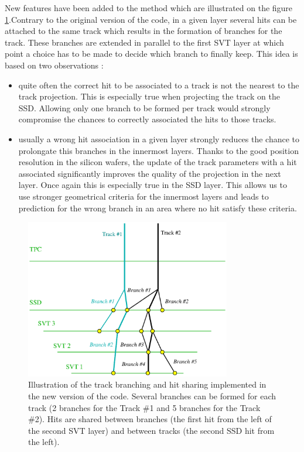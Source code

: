 \documentclass[twoside]{article}
\begin{document}
New features have been added to the method which are illustrated on
the figure \ref{fig:idea}.Contrary to the original version of the
code, in a given layer several hits can be attached to the same track
which results in the formation of branches for the track. These
branches are extended in parallel to the first SVT layer at which
point a choice has to be made to decide which branch to finally
keep. This idea is based on two observations :
\begin{itemize}
\item quite often the correct hit to be associated to a track is not
the nearest to the track projection. This is especially true when
projecting the track on the SSD. Allowing only one branch to be formed
per track would strongly compromise the chances to correctly
associated the hits to those tracks.
\item usually a wrong hit association in a given layer strongly reduces 
the chance to prolongate this branches in the innermost layers. Thanks
to the good position resolution in the silicon wafers, the update of
the track parameters with a hit associated significantly improves the
quality of the projection in the next layer. Once again this is
especially true in the SSD layer. This allows us to use stronger
geometrical criteria for the innermost layers and leads to prediction
for the wrong branch in an area where no hit satisfy these criteria.
\end{itemize}

\begin{figure}[h]
    \begin{center} 
	\includegraphics[width=0.8\textwidth]{idea.eps}
    	\caption{Illustration of the track branching and hit sharing
    implemented in the new version of the code. Several branches can
    be formed for each track (2 branches for the Track \#1 and 5
    branches for the Track \#2). Hits are shared between branches (the
    first hit from the left of the second SVT layer) and between
    tracks (the second SSD hit from the left).\label{fig:idea}} 
\end{center}
	
\end{figure}
\end{document}
